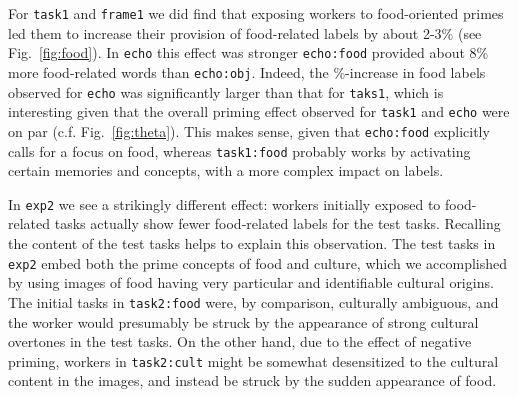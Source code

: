 \documentclass[12pt]{article}
\begin{document}
For \texttt{task1} and \texttt{frame1} we did find that exposing workers to 
food-oriented primes led them to increase their provision of food-related 
labels by about 2-3\% (see Fig.~\ref{fig:food}).  
In \texttt{echo} this effect was stronger
\texttt{echo:food} provided about 8\% more food-related words than 
\texttt{echo:obj}.  Indeed, the \%-increase in food labels observed for
\texttt{echo} was significantly larger than that for \texttt{taks1}, which is 
interesting
given that the overall priming effect observed for \texttt{task1} and 
\texttt{echo} were on par (c.f. Fig.~\ref{fig:theta}).
This makes sense, given that \texttt{echo:food} explicitly calls for a focus 
on food, whereas \texttt{task1:food} probably works by activating certain 
memories and concepts, with a more complex impact on labels.

In \texttt{exp2} we see a strikingly different effect: workers initially 
exposed to food-related tasks actually show fewer food-related labels for the
test tasks.  Recalling the content of the test tasks helps to explain this
observation.  The test tasks in \texttt{exp2} embed both the prime concepts
of food and culture, which we accomplished by using images of food having
very particular and identifiable cultural origins.  The initial tasks in
\texttt{task2:food} were, by comparison, culturally ambiguous, and the worker
would presumably be struck by the appearance of strong cultural overtones
in the test tasks.  On the other hand, due to the effect of negative priming,
workers in \texttt{task2:cult} might be somewhat desensitized to the cultural
content in the images, and instead be struck by the sudden appearance of food.
\end{document}
